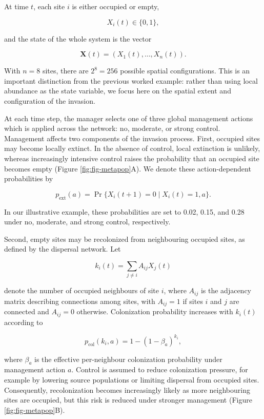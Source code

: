 \documentclass[
  11pt,
  a4paper,
]{article}
\begin{document}
At time \(t\), each site \(i\) is either occupied or empty,

\[
X_i(t) \in \{0,1\},
\]

and the state of the whole system is the vector

\[
\mathbf{X}(t) =
\left(
X_1(t),\ldots,X_n(t)
\right).
\]

With \(n=8\) sites, there are \(2^8=256\) possible spatial configurations. This is an important distinction from the previous worked example: rather than using local abundance as the state variable, we focus here on the spatial extent and configuration of the invasion.

At each time step, the manager selects one of three global management actions which is applied across the network: no, moderate, or strong control. Management affects two components of the invasion process. First, occupied sites may become locally extinct. In the absence of control, local extinction is unlikely, whereas increasingly intensive control raises the probability that an occupied site becomes empty (Figure \ref{fig:fig-metapop}A). We denote these action-dependent probabilities by

\[
p_{\mathrm{ext}}(a)
=
\Pr\{X_i(t+1)=0 \mid X_i(t)=1,a\}.
\]

In our illustrative example, these probabilities are set to 0.02, 0.15, and 0.28 under no, moderate, and strong control, respectively.

Second, empty sites may be recolonized from neighbouring occupied sites, as defined by the dispersal network. Let

\[
k_i(t)
=
\sum_{j \neq i}
A_{ij}X_j(t)
\]

denote the number of occupied neighbours of site \(i\), where \(A_{ij}\) is the adjacency matrix describing connections among sites, with \(A_{ij}=1\) if sites \(i\) and \(j\) are connected and \(A_{ij}=0\) otherwise. Colonization probability increases with \(k_i(t)\) according to

\[
p_{\mathrm{col}}(k_i,a)
=
1-
\left(
1-\beta_a
\right)^{k_i},
\]

where \(\beta_a\) is the effective per-neighbour colonization probability under management action \(a\). Control is assumed to reduce colonization pressure, for example by lowering source populations or limiting dispersal from occupied sites. Consequently, recolonization becomes increasingly likely as more neighbouring sites are occupied, but this risk is reduced under stronger management (Figure \ref{fig:fig-metapop}B).
\end{document}
